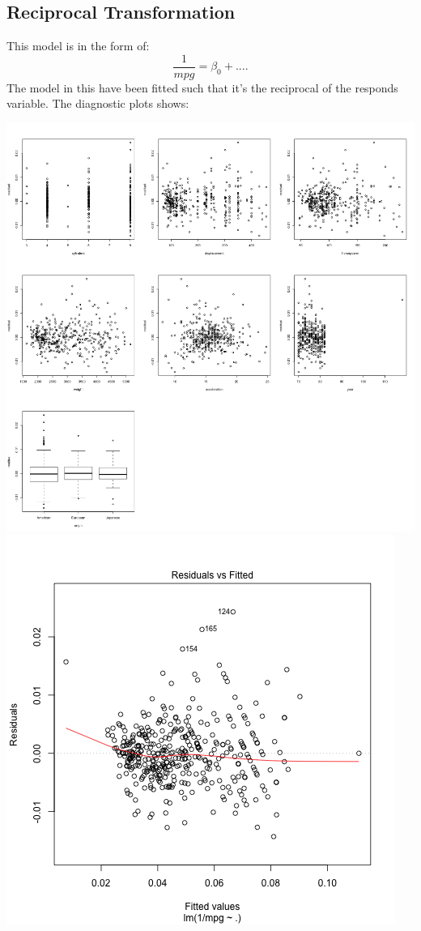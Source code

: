 \documentclass[11pt]{article} %
\begin{document}
\subsection{Reciprocal Transformation}
This model is in the form of:
$$
\frac{1}{mpg}= \beta_0 + ....
$$
The model in this have been fitted such that it's the reciprocal of the responds variable. The diagnostic plots shows:
\begin{center}
\includegraphics[scale=0.13]{4_res_vs_value}
\includegraphics[scale=0.3]{4_res_vs_fitted}
\end{center}
\end{document}
